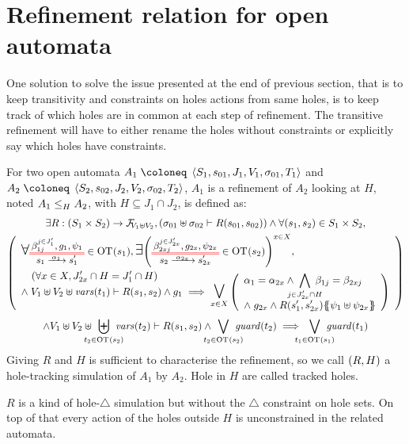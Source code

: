 \documentclass{article}
\begin{document}
\section{Refinement relation for open automata}\label{sec:refinement}
One solution to solve the issue presented at the end of previous section, that is to keep transitivity and constraints on holes actions from same holes, is to keep track of which holes are in common at each step of refinement.
The transitive refinement will have to either rename the holes without constraints or explicitly say which holes have constraints.
\begin{defi}
For two open automata \(A_1 \defobject \OA{S_1}{s_{01}}{J_1}{V_1}{\sigma_{01}}{T_1}\) and \(A_2 \defobject \OA{S_2}{s_{02}}{J_2}{V_2}{\sigma_{02}}{T_2}\), \(A_1\) is a refinement of \(A_2\) looking at \(H\), noted \(\wrel{A_1}{A_2}{H}\), with \(H \subseteq J_1 \cap J_2\), is defined as:
\begin{multline*}
	\exists R: \mpar{S_1 \times S_2} \to \rformulas[V_1 \uplus V_2], \mpar{\sigma_{01} \uplus \sigma_{02} \vdash R\mpar{s_{01}, s_{02}}} \wedge \forall \mpar{s_1, s_2} \in S_1 \times S_2, \\
	\mpar{\everymath{\displaystyle}\begin{array}{l}
		\bigsymb{\forall} \OTx{1}{}{1}{1} \in \fOT{s_1}, \bigsymb{\exists} \mpar{\OTx{2}{x}{2x}{2x} \in \fOT{s_2}}^{x \in X}, \\[12pt]
		\quad \mpar{\forall x \in X, J'_{2x} \cap H = J'_1 \cap H} \\[-10pt]
		\nwedge V_1 \uplus V_2 \uplus \fvars{t_1} \vdash R\mpar{s_1, s_2} \wedge g_1 \implies \operatorname*{\bigsymb{\bigvee}}_{x \in X} \mpar{\begin{array}{l}
			\alpha_1 = \alpha_{2x} \wedge \bigwedge_\subbox{j \in J'_{2x} \cap H} \beta_{1j} = \beta_{2xj} \\
			\nwedge g_{2x} \wedge R\mpar{s'_1, s'_{2x}}\psubst{\psi_1 \uplus \psi_{2x}}
		\end{array}} \\
	\end{array}} \\
	\wedge V_1 \uplus V_2 \uplus \biguplus_\subbox{t_2 \in \fOT{s_2}} \fvars{t_2} \vdash R\mpar{s_1, s_2} \wedge \bigvee_\subbox{t_2 \in \fOT{s_2}} \fguard{t_2} \implies \bigvee_\subbox{t_1 \in \fOT{s_1}} \fguard{t_1}
\end{multline*}
Giving \(R\) and \(H\) is sufficient to characterise the refinement, so we call \(\mpar{R, H}\) a hole-tracking simulation of \(A_1\) by \(A_2\).
Hole in \(H\) are called tracked holes.
\end{defi}
\(R\) is a kind of hole-\(\triangle\) simulation but without the \(\triangle\) constraint on hole sets.
On top of that every action of the holes outside \(H\) is unconstrained in the related automata.
\end{document}
